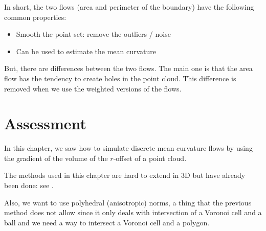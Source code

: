 
In short, the two flows (area and perimeter of the boundary) have the following
common properties:
\begin{itemize}
    \item Smooth the point set: remove the outliers / noise
    \item Can be used to estimate the mean curvature
\end{itemize}

But, there are differences between the two flows. The main one is that the area
flow has the tendency to create holes in the point cloud. This difference is
removed when we use the weighted versions of the flows.

\section{Assessment}

In this chapter, we saw how to simulate discrete mean curvature flows by using
the gradient of the volume of the $r$-offset of a point cloud.

The methods used in this chapter are hard to extend in 3D but have already been
done: see \cite{cazals2011computing}.

Also, we want to use polyhedral (anisotropic) norms, a thing that the previous
method does not allow since it only deals with intersection of a Voronoi cell
and a ball and we need a way to intersect a Voronoi cell and a polygon.


